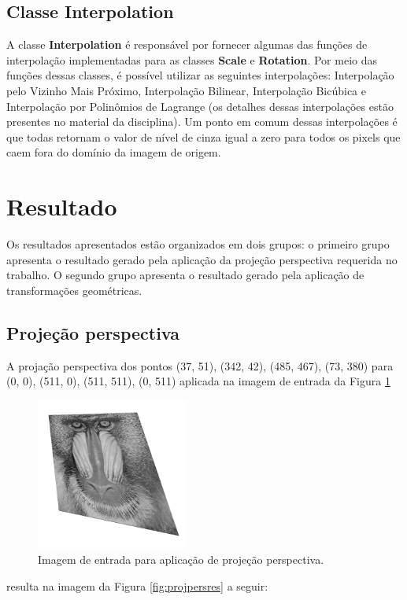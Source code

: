 \documentclass{article}
\begin{document}
\subsection{Classe Interpolation}
A classe \textbf{Interpolation} é responsável por fornecer algumas das funções de interpolação implementadas para as classes \textbf{Scale} e \textbf{Rotation}. Por meio das funções dessas classes, é possível utilizar as seguintes interpolações: Interpolação pelo Vizinho Mais Próximo, Interpolação Bilinear, Interpolação Bicúbica e Interpolação por Polinômios de Lagrange (os detalhes dessas interpolações estão presentes no material da disciplina). Um ponto em comum dessas interpolações é que todas retornam o valor de nível de cinza igual a zero para todos os pixels que caem fora do domínio da imagem de origem.


\section{Resultado}
Os resultados apresentados estão organizados em dois grupos: o primeiro grupo apresenta o resultado gerado pela aplicação da projeção perspectiva requerida no trabalho. O segundo grupo apresenta o resultado gerado pela aplicação de transformações geométricas. 


\subsection{Projeção perspectiva}
A projação perspectiva dos pontos (37, 51), (342, 42), (485, 467), (73, 380) para (0, 0), (511, 0),
(511, 511), (0, 511) aplicada na imagem de entrada da Figura \ref{fig:projpers}

\begin{figure}[!htp]%
	\centering
	\includegraphics[width=5cm]{baboon_perspectiva.png}
	\caption{Imagem de entrada para aplicação de projeção perspectiva.}%
	\label{fig:projpers}%
\end{figure}

\noindent
resulta na imagem da Figura \ref{fig:projpersres} a seguir:
\end{document}
